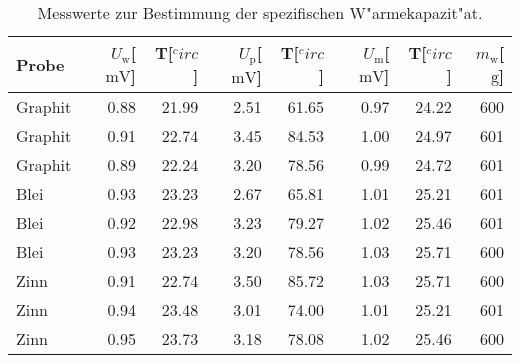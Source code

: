 
\begin{table}[!h]
\begin{center}
\begin{tabular}{|l|r|r|r|r|r|r|r|}
\hline
Probe & $U_\mathrm{w}$[$\SI{}{\milli\volt}$] & T[$^circ$] & $U_\mathrm{p}$[$\SI{}{\milli\volt}$] & T[$^circ$] & $U_\mathrm{m}$[$\SI{}{\milli\volt}$] & T[$^circ$] & $m_\mathrm{w}$[$\SI{}{\gram}$]\\
\hline
\hline
Graphit & 0.88 & 21.99 & 2.51 & 61.65 &	0.97 & 24.22 & 600 \\
Graphit & 0.91 & 22.74 & 3.45 &	84.53 & 1.00 & 24.97 & 601 \\
Graphit & 0.89 & 22.24 & 3.20 &	78.56 & 0.99 & 24.72 & 601 \\
\hline
Blei    & 0.93 & 23.23 & 2.67 & 65.81 &	1.01 & 25.21 & 601 \\
Blei    & 0.92 & 22.98 & 3.23 &	79.27 & 1.02 & 25.46 & 601 \\
Blei    & 0.93 & 23.23 & 3.20 &	78.56 & 1.03 & 25.71 & 600 \\
\hline
Zinn    & 0.91 & 22.74 & 3.50 &	85.72 & 1.03 & 25.71 & 600 \\
Zinn    & 0.94 & 23.48 & 3.01 &	74.00 & 1.01 & 25.21 & 601 \\
Zinn    & 0.95 & 23.73 & 3.18 & 78.08 & 1.02 & 25.46 & 600 \\
\hline
\end{tabular}
\caption[]{Messwerte zur Bestimmung der spezifischen W"armekapazit"at.}
\label{proben}
\end{center}
\end{table}